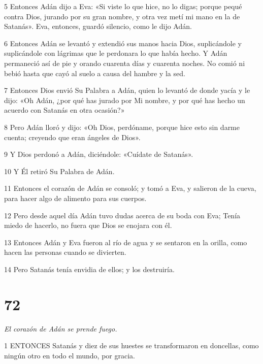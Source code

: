 \par 5 Entonces Adán dijo a Eva: «Si viste lo que hice, no lo digas; porque pequé contra Dios, jurando por su gran nombre, y otra vez metí mi mano en la de Satanás». Eva, entonces, guardó silencio, como le dijo Adán.

\par 6 Entonces Adán se levantó y extendió sus manos hacia Dios, suplicándole y suplicándole con lágrimas que le perdonara lo que había hecho. Y Adán permaneció así de pie y orando cuarenta días y cuarenta noches. No comió ni bebió hasta que cayó al suelo a causa del hambre y la sed.

\par 7 Entonces Dios envió Su Palabra a Adán, quien lo levantó de donde yacía y le dijo: «Oh Adán, ¿por qué has jurado por Mi nombre, y por qué has hecho un acuerdo con Satanás en otra ocasión?»

\par 8 Pero Adán lloró y dijo: «Oh Dios, perdóname, porque hice esto sin darme cuenta; creyendo que eran ángeles de Dios».

\par 9 Y Dios perdonó a Adán, diciéndole: «Cuídate de Satanás».

\par 10 Y Él retiró Su Palabra de Adán.

\par 11 Entonces el corazón de Adán se consoló; y tomó a Eva, y salieron de la cueva, para hacer algo de alimento para sus cuerpos.

\par 12 Pero desde aquel día Adán tuvo dudas acerca de su boda con Eva; Tenía miedo de hacerlo, no fuera que Dios se enojara con él.

\par 13 Entonces Adán y Eva fueron al río de agua y se sentaron en la orilla, como hacen las personas cuando se divierten.

\par 14 Pero Satanás tenía envidia de ellos; y los destruiría.

\chapter{72}

\par \textit{El corazón de Adán se prende fuego.}

\par 1 ENTONCES Satanás y diez de sus huestes se transformaron en doncellas, como ningún otro en todo el mundo, por gracia.

